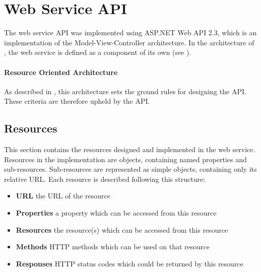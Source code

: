 \section{Web Service API}\label{design:web_service}
The web service API was implemented using ASP.NET Web API 2.3\cite{aspnet_webapi}, which is an implementation of the Model-View-Controller architecture.
In the architecture of \projectname{}, the web service is defined as a component of its own (see ).



\paragraph{Resource Oriented Architecture}
As described in , this architecture sets the ground rules for designing the API.
These criteria are therefore upheld by the API.

\subsection{Resources}\label{webservice:resources}
This section contains the resources designed and implemented in the web service.
Resources in the implementation are objects, containing named properties and sub-resources.
Sub-resources are represented as simple objects, containing only its relative URL.
Each resource is described following this structure:
\begin{itemize}
\item \textbf{URL} the URL of the resource
\item \textbf{Properties} a property which can be accessed from this resource
\item \textbf{Resources} the resource(s) which can be accessed from this resource
\item \textbf{Methods} HTTP methods which can be used on that resource
\item \textbf{Responses} HTTP status codes which could be returned by this resource
\end{itemize}

